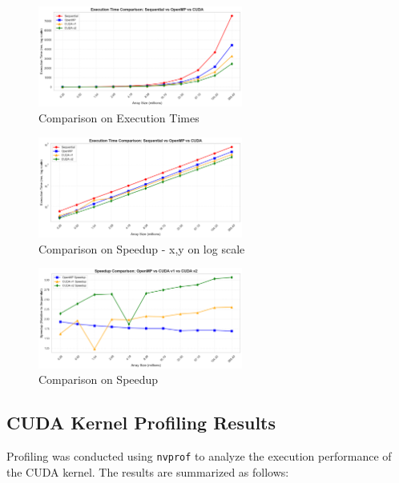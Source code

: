 \documentclass{article}
\begin{document}
\newpage 

\begin{figure}[h]
  \centering
  \includegraphics[width=0.6\textwidth]{Images/compare1.png}
  \caption{Comparison on Execution Times}
\end{figure}

\begin{figure}
  \centering
  \includegraphics[width=0.6\textwidth]{Images/compare2.png}
  \caption{Comparison on Speedup - x,y on log scale}
\end{figure}

\begin{figure}[h]
  \centering
  \includegraphics[width=0.6\textwidth]{Images/compare3.png}
  \caption{Comparison on Speedup}
\end{figure}

\newpage

\subsection{CUDA Kernel Profiling Results}

Profiling was conducted using \texttt{nvprof} to analyze the execution performance of the CUDA kernel. The results are summarized as follows:
\end{document}
